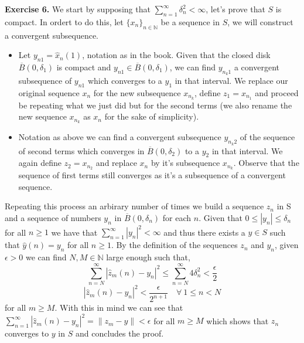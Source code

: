 \documentclass{article}
\begin{document}
\begin{exercise}\textbf{Exercise 6.}
    We start by supposing that $\sum_{n=1}^{\infty} \delta_n^2 < \infty$, let's prove that $S$ is compact. In ordert to do this, let $\{x_n\}_{n \in \mathbb{N}}$ be a sequence in $S$, we will construct a convergent subsequence.
\begin{itemize}
    \item Let $y_{n1} = \hat{x}_n \left( 1 \right)$, notation as in the book. Given that the closed disk $\overline{B} \left( 0,\delta_1 \right)$ is compact and $y_{n1} \in \overline{B} \left( 0, \delta_1 \right) $, we can find $y_{n_k1}$ a convergent subsequence of $y_{n1}$ which converges to a $y_1$ in that interval. We replace our original sequence $x_n$ for the new subsequence $x_{n_k}$, define $z_1 = x_{n_1}$  and proceed be repeating what we just did but for the second terms (we also rename the new sequence $x_{n_k}$ as $x_n$ for the sake of simplicity).
    \item Notation as above we can find a convergent subsequence $y_{n_k2}$ of the sequence of second terms which converges in $\overline{B} \left( 0,\delta_2 \right) $ to a $y_2$ in that interval. We again define $z_2 = x_{n_2}$ and replace $x_n$ by it's subsequence $x_{n_k}$. Observe that the sequence of first terms still converges as it's a subsequence of a convergent sequence.  
\end{itemize}
Repeating this process an arbirary number of times we build a sequence $z_n$ in S and a sequence of numbers $y_n$ in $\overline{B} \left( 0,\delta_n \right) $ for each $n$. Given that $0 \le |y_n| \le \delta_n$ for all $n \ge 1$ we have that $\sum_{n=1}^{\infty} |y_n|^2 < \infty $ and thus there exists a $y \in S$ such that $\hat{y} \left( n \right) = y_n$ for all $n \ge 1$. By the definition of the sequences $z_n$ and $y_n$, given $\epsilon > 0$ we can find $N, M \in \mathbb{N}$ large enough such that,
\begin{equation}
    \sum_{n=N}^{\infty} |\hat{z}_m \left( n \right)  - y_n|^2 \le \sum_{n=N}^{\infty} 4\delta_n^2   < \frac{\epsilon}{2}
\end{equation}
\begin{equation}
    |\hat{z}_m \left( n \right)  - y_n|^2 < \frac{\epsilon}{2^{n+1}} \quad \forall\ 1 \le n < N
\end{equation}
for all $m \ge M$. With this in mind we can see that $\sum_{n=1}^{\infty} |\hat{z}_m \left( n \right) - y_n|^2 =  \|z_m-y\|<\epsilon$ for all $m \ge M$ which shows that $z_n$ converges to $y$ in $S$ and concludes the proof. 


\end{exercise}
\end{document}
